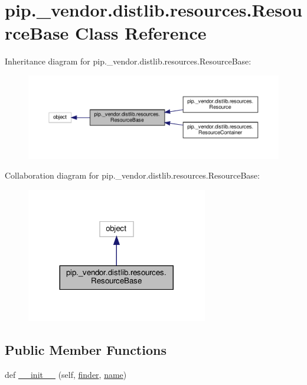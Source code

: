 \hypertarget{classpip_1_1__vendor_1_1distlib_1_1resources_1_1ResourceBase}{}\section{pip.\+\_\+vendor.\+distlib.\+resources.\+Resource\+Base Class Reference}
\label{classpip_1_1__vendor_1_1distlib_1_1resources_1_1ResourceBase}


Inheritance diagram for pip.\+\_\+vendor.\+distlib.\+resources.\+Resource\+Base\+:
\nopagebreak
\begin{figure}[H]
\begin{center}
\leavevmode
\includegraphics[width=350pt]{classpip_1_1__vendor_1_1distlib_1_1resources_1_1ResourceBase__inherit__graph}
\end{center}
\end{figure}


Collaboration diagram for pip.\+\_\+vendor.\+distlib.\+resources.\+Resource\+Base\+:
\nopagebreak
\begin{figure}[H]
\begin{center}
\leavevmode
\includegraphics[width=224pt]{classpip_1_1__vendor_1_1distlib_1_1resources_1_1ResourceBase__coll__graph}
\end{center}
\end{figure}
\subsection*{Public Member Functions}
\begin{DoxyCompactItemize}
\item 
def \hyperlink{classpip_1_1__vendor_1_1distlib_1_1resources_1_1ResourceBase_a8f489b695c1e0ea847d52c3a3259eed0}{\+\_\+\+\_\+init\+\_\+\+\_\+} (self, \hyperlink{classpip_1_1__vendor_1_1distlib_1_1resources_1_1ResourceBase_a6f2fdd2852eb57544e157c78ccec407f}{finder}, \hyperlink{classpip_1_1__vendor_1_1distlib_1_1resources_1_1ResourceBase_a19a71ce38fa771d3b4ecb6de30888905}{name})
\end{DoxyCompactItemize}
